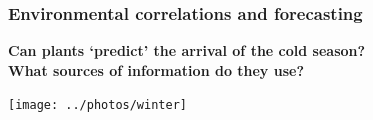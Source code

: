 \documentclass[10pt]{beamer}
\begin{document}
%
%
%



\begin{frame}
\frametitle{Environmental correlations and forecasting \Discussion}

\textbf{Can plants `predict' the arrival of the cold season?\\
 What sources of information do they use?}

    \centering
    \texttt{[image: ../photos/winter]}
\end{frame}
\end{document}
